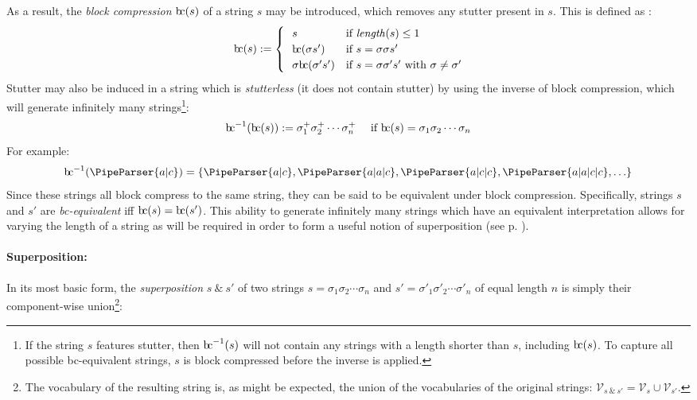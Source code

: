 \documentclass[a4paper,12pt,leqno]{article}
\newcommand{\bc}{{\rm b\!c}}
\newcommand{\vph}[1]{\vphantom{#1}}
\newcommand{\ebox}[1]{\fbox{$\vph{'(),}#1$}}
\renewcommand{\sp}{~\&~}
\newcommand{\V}{\mathcal{V}}
\newcommand{\EventString}[1]{%
	\renewcommand*{\do}[1]{\ebox{##1}}%
	\PipeParser{#1}%
}
\begin{document}
As a result, the \textit{block compression} $\bc(s)$ of a string $s$ may be introduced, which removes any stutter present in $s$. This is defined as \citep{fernando2015semantics, woods2017towards}:
\begin{align}\label{def:bc}
\bc(s) := 
\begin{cases}
	~~s & \text{if \textit{length}}(s) \leq 1\\
	~~\bc(\sigma s') & \text{if } s = \sigma \sigma s'\\
	~~\sigma \bc(\sigma' s') & \text{if } s = \sigma \sigma' s' \text{ with } \sigma \neq \sigma'
\end{cases}
\end{align}
Stutter may also be induced in a string which is \textit{stutterless} (it does not contain stutter) by using the inverse of block compression, which will generate infinitely many strings\footnote{If the string $s$ features stutter, then $\bc^{-1}(s)$ will not contain any strings with a length shorter than $s$, including $\bc(s)$. To capture all possible \bc-equivalent strings, $s$ is block compressed before the inverse is applied.}:
\begin{align}\label{def:inverse-bc}
\bc^{-1}(\bc(s)) := \sigma_1^+ \sigma_2^+ \cdots \sigma_n^+ ~~~ \mbox{ if } \bc(s) = \sigma_1 \sigma_2 \cdots \sigma_n
\end{align}
For example:
\begin{align}\label{ex:inverse-bc}
	\bc^{-1}(\EventString{a|c}) = \{\EventString{a|c}, \EventString{a|a|c}, \EventString{a|c|c}, \EventString{a|a|c|c}, \ldots\}
\end{align}
Since these strings all block compress to the same string, they can be said to be equivalent under block compression. Specifically, strings $s$ and $s'$ are \textit{\bc -equivalent} iff $\bc(s) = \bc(s')$. This ability to generate infinitely many strings which have an equivalent interpretation allows for varying the length of a string as will be required in order to form a useful notion of superposition (see p. \pageref{def:initial-async-superposition}).

\paragraph{Superposition:}\label{para:str-op-sp}
In its most basic form, the \textit{superposition} $s \sp s'$ of two strings $s = \sigma_1\sigma_2\cdots\sigma_n$ and $s' = \sigma'_1\sigma'_2\cdots\sigma'_n$ of equal length $n$ is simply their component-wise union\footnote{The vocabulary of the resulting string is, as might be expected, the union of the vocabularies of the original strings: $\V_{s \sp s'} = \V_s \cup \V_{s'}$.}:
\end{document}
